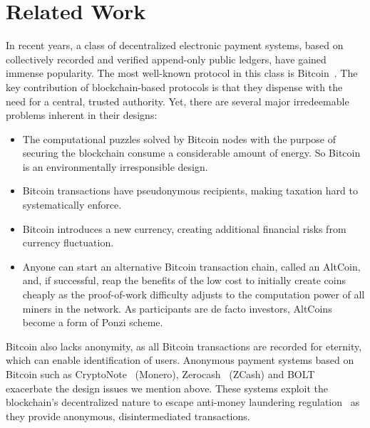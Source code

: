 \documentclass[sigconf, authordraft]{acmart}
\begin{document}
\section{Related Work}


In recent years, a class of decentralized electronic payment systems,
based on collectively recorded and verified append-only public
ledgers, have gained immense popularity.  The most well-known protocol
in this class is Bitcoin~\cite{nakamoto2008bitcoin}.  The key
contribution of blockchain-based protocols is that they dispense with
the need for a central, trusted authority.  Yet, there are several
major irredeemable problems inherent in their designs:

\begin{itemize}
  \item The computational puzzles solved by Bitcoin nodes with the purpose
    of securing the blockchain consume a considerable amount of energy.
    So Bitcoin is an environmentally irresponsible design.
  \item Bitcoin transactions have pseudonymous recipients, making taxation
    hard to systematically enforce.
  \item Bitcoin introduces a new currency, creating additional
    financial risks from currency fluctuation.
  \item Anyone can start an alternative Bitcoin transaction chain,
    called an AltCoin, and, if successful, reap the benefits of the low
    cost to initially create coins cheaply as the proof-of-work
    difficulty adjusts to the computation power of all
    miners in the network.  As participants are
    de facto investors, AltCoins become a form of Ponzi scheme.
\end{itemize}

Bitcoin also lacks anonymity, as all Bitcoin transactions are recorded
for eternity, which can enable identification of users.  Anonymous
payment systems based on Bitcoin such as CryptoNote~\cite{cryptonote}
(Monero), Zerocash~\cite{zerocash} (ZCash) and BOLT~\cite{BOLT}
exacerbate the design issues we mention above.  These systems exploit the
blockchain's decentralized nature to escape anti-money laundering
regulation~\cite{molander1998cyberpayments} as they provide anonymous,
disintermediated transactions.
\end{document}
